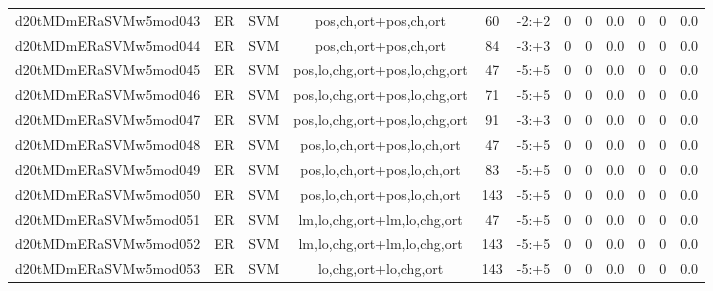 \documentclass[a4paper]{article}
\begin{document}
\begin{landscape}
\begin{center}
\begin{tabular}{ |c|c|c|c|c|c|c|c|c|c|c|c|}
 
 	
 	\small{ d20tMDmERaSVMw5mod043 } & ER & SVM & pos,ch,ort+pos,ch,ort  &  60 &  -2:+2  &  0 & 0 & 0.0  &  0 & 0 & 0.0 \\
 	

 
 	
 	\small{ d20tMDmERaSVMw5mod044 } & ER & SVM & pos,ch,ort+pos,ch,ort  &  84 &  -3:+3  &  0 & 0 & 0.0  &  0 & 0 & 0.0 \\
 	

 
 	
 	\small{ d20tMDmERaSVMw5mod045 } & ER & SVM & pos,lo,chg,ort+pos,lo,chg,ort  &  47 &  -5:+5  &  0 & 0 & 0.0  &  0 & 0 & 0.0 \\
 	

 
 	
 	\small{ d20tMDmERaSVMw5mod046 } & ER & SVM & pos,lo,chg,ort+pos,lo,chg,ort  &  71 &  -5:+5  &  0 & 0 & 0.0  &  0 & 0 & 0.0 \\
 	

 
 	
 	\small{ d20tMDmERaSVMw5mod047 } & ER & SVM & pos,lo,chg,ort+pos,lo,chg,ort  &  91 &  -3:+3  &  0 & 0 & 0.0  &  0 & 0 & 0.0 \\
 	

 
 	
 	\small{ d20tMDmERaSVMw5mod048 } & ER & SVM & pos,lo,ch,ort+pos,lo,ch,ort  &  47 &  -5:+5  &  0 & 0 & 0.0  &  0 & 0 & 0.0 \\
 	

 
 	
 	\small{ d20tMDmERaSVMw5mod049 } & ER & SVM & pos,lo,ch,ort+pos,lo,ch,ort  &  83 &  -5:+5  &  0 & 0 & 0.0  &  0 & 0 & 0.0 \\
 	

 
 	
 	\small{ d20tMDmERaSVMw5mod050 } & ER & SVM & pos,lo,ch,ort+pos,lo,ch,ort  &  143 &  -5:+5  &  0 & 0 & 0.0  &  0 & 0 & 0.0 \\
 	

 
 	
 	\small{ d20tMDmERaSVMw5mod051 } & ER & SVM & lm,lo,chg,ort+lm,lo,chg,ort  &  47 &  -5:+5  &  0 & 0 & 0.0  &  0 & 0 & 0.0 \\
 	

 
 	
 	\small{ d20tMDmERaSVMw5mod052 } & ER & SVM & lm,lo,chg,ort+lm,lo,chg,ort  &  143 &  -5:+5  &  0 & 0 & 0.0  &  0 & 0 & 0.0 \\
 	

 
 	
 	\small{ d20tMDmERaSVMw5mod053 } & ER & SVM & lo,chg,ort+lo,chg,ort  &  143 &  -5:+5  &  0 & 0 & 0.0  &  0 & 0 & 0.0 \\
 	


\end{tabular}
\end{center}
\end{landscape}
\end{document}
